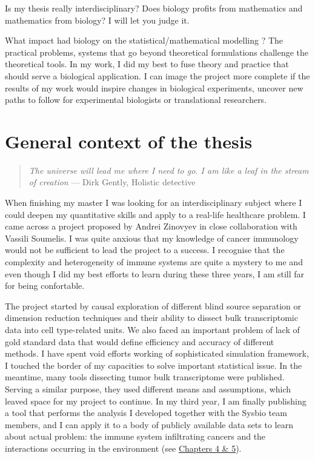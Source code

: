 \documentclass[12pt,]{book}
\theoremstyle{definition}
\theoremstyle{definition}
\theoremstyle{definition}
\theoremstyle{remark}
\begin{document}
Is my thesis really interdisciplinary? Does biology profits from
mathematics and mathematics from biology? I will let you judge it.

What impact had biology on the statistical/mathematical modelling ? The
practical problems, systems that go beyond theoretical formulations
challenge the theoretical tools. In my work, I did my best to fuse
theory and practice that should serve a biological application. I can
image the project more complete if the results of my work would inspire
changes in biological experiments, uncover new paths to follow for
experimental biologists or translational researchers.

\hypertarget{general-context-of-the-thesis}{%
\section*{General context of the
thesis}\label{general-context-of-the-thesis}}

\begin{quote}
\emph{The universe will lead me where I need to go. I am like a leaf in
the stream of creation} --- Dirk Gently, Holistic detective
\end{quote}

When finishing my master I was looking for an interdisciplinary subject
where I could deepen my quantitative skills and apply to a real-life
healthcare problem. I came across a project proposed by Andrei Zinovyev
in close collaboration with Vassili Soumelis. I was quite anxious that
my knowledge of cancer immunology would not be sufficient to lead the
project to a success. I recognise that the complexity and heterogeneity
of immune systems are quite a mystery to me and even though I did my
best efforts to learn during these three years, I am still far for being
confortable.

The project started by causal exploration of different blind source
separation or dimension reduction techniques and their ability to
dissect bulk transcriptomic data into cell type-related units. We also
faced an important problem of lack of gold standard data that would
define efficiency and accuracy of different methods. I have spent void
efforts working of sophisticated simulation framework, I touched the
border of my capacities to solve important statistical issue. In the
meantime, many tools dissecting tumor bulk transcriptome were published.
Serving a similar purpose, they used different means and assumptions,
which leaved space for my project to continue. In my third year, I am
finally publishing a tool that performs the analysis I developed
together with the Sysbio team members, and I can apply it to a body of
publicly available data sets to learn about actual problem: the immune
system infiltrating cancers and the interactions occurring in the
environment (see \protect\hyperlink{deconica}{Chapters 4 \& 5}).
\end{document}
